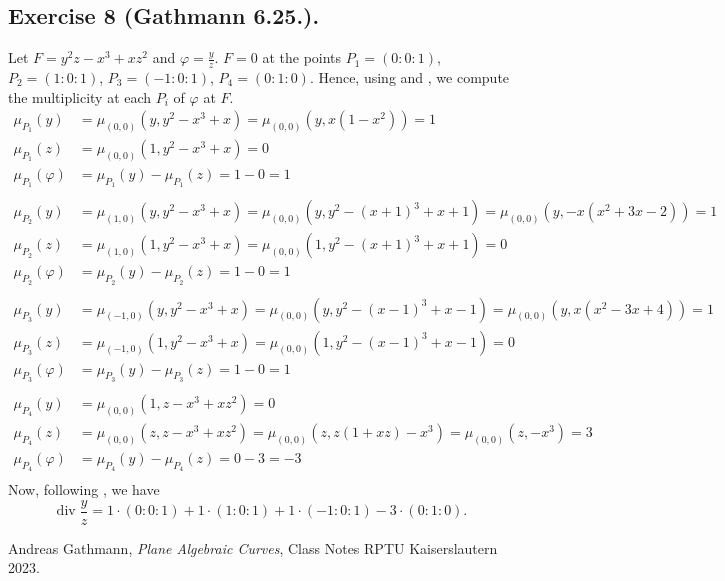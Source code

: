 \documentclass[11pt,a4paper]{article}
\begin{document}
\subsection*{Exercise 8 (Gathmann 6.25.).}
Let $ F = y^2 z - x^3 + xz^2 $ and $ \varphi = \frac{y}{z} $. $ F = 0$ at the points $ P_1 = (0:0:1) $, $ P_2 = (1:0:1) $, $ P_3 = (-1:0:1) $, $ P_4 = (0:1:0) $. Hence, using \cite[Construction 6.17]{gath} and \cite[Algorithm 2.12]{gath}, we compute the multiplicity at each $ P_i $ of $ \varphi $ at $ F $.
\begin{align*}
  \mu_{P_1}(y) &= \mu_{(0,0)}(y, y^2-x^3+x) = \mu_{(0,0)}(y, x(1-x^2)) = 1 \\
  \mu_{P_1}(z) &= \mu_{(0,0)}(1, y^2-x^3+x) = 0 \\
  \mu_{P_1}(\varphi) &= \mu_{P_1}(y) - \mu_{P_1}(z) = 1 - 0 = 1 \\
  \\
  \mu_{P_2}(y) &= \mu_{(1,0)}(y, y^2-x^3+x) = \mu_{(0,0)}(y, y^2-(x+1)^3+x+1) = \mu_{(0,0)}(y, -x(x^2+3x-2)) = 1 \\
  \mu_{P_2}(z) &= \mu_{(1,0)}(1, y^2-x^3+x) = \mu_{(0,0)}(1, y^2-(x+1)^3+x+1) = 0 \\
  \mu_{P_2}(\varphi) &= \mu_{P_2}(y) - \mu_{P_2}(z) = 1 - 0 = 1 \\
  \\
  \mu_{P_3}(y) &= \mu_{(-1,0)}(y, y^2-x^3+x) = \mu_{(0,0)}(y, y^2-(x-1)^3+x-1) = \mu_{(0,0)}(y, x(x^2-3x+4)) = 1 \\
  \mu_{P_3}(z) &= \mu_{(-1,0)}(1, y^2-x^3+x) = \mu_{(0,0)}(1, y^2-(x-1)^3+x-1) = 0 \\
  \mu_{P_3}(\varphi) &= \mu_{P_3}(y) - \mu_{P_3}(z) = 1 - 0 = 1 \\
  \\
  \mu_{P_4}(y) &= \mu_{(0,0)}(1, z-x^3+xz^2) = 0 \\
  \mu_{P_4}(z) &= \mu_{(0,0)}(z, z-x^3+xz^2) = \mu_{(0,0)}(z, z(1+xz)-x^3) = \mu_{(0,0)}(z, -x^3) = 3\\
  \mu_{P_4}(\varphi) &= \mu_{P_4}(y) - \mu_{P_4}(z) = 0 - 3 = -3 \\
\end{align*}
Now, following \cite[Construction 6.23]{gath}, we have
$$
  \operatorname{div}\frac{y}{z} = 1 \cdot (0:0:1) + 1 \cdot (1:0:1) + 1 \cdot (-1:0:1) - 3 \cdot (0:1:0).
$$

\begin{thebibliography}{9}

  Andreas Gathmann,
  \textit{Plane Algebraic Curves},
  Class Notes RPTU Kaiserslautern 2023.
  
\end{thebibliography}
\end{document}
